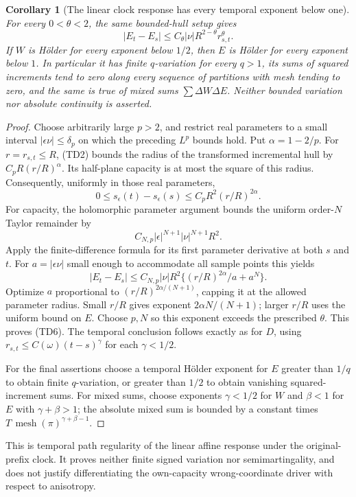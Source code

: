 \documentclass[11pt]{article}
\newtheorem{corollary}[theorem]{Corollary}
\theoremstyle{definition}\newtheorem{definition}[theorem]{Definition}
\theoremstyle{remark}\newtheorem{remark}[theorem]{Remark}
\begin{document}
\begin{corollary}[The linear clock response has every temporal exponent below one]
\label{cor:temporal-clock-response-nearly-lipschitz}
For every $0<\theta<2$, the same bounded-hull setup gives
\[
 |E_t-E_s|\le C_\theta|\nu|R^{2-\theta}r_{s,t}^{\theta}.
 \tag{TD6}
\]
If $W$ is H\"older for every exponent below $1/2$, then $E$ is
H\"older for every exponent below $1$. In particular it has finite
$q$-variation for every $q>1$, its sums of squared increments tend
to zero along every sequence of partitions with mesh tending to zero,
and the same is true of mixed sums $\sum\Delta W\Delta E$.
Neither bounded variation nor absolute continuity is asserted.
\end{corollary}
\begin{proof}
Choose arbitrarily large $p>2$, and restrict real parameters to a
small interval $|\epsilon\nu|\le\delta_p$ on which the preceding
$L^p$ bounds hold. Put $\alpha=1-2/p$. For $r=r_{s,t}\le R$,
(TD2) bounds the radius of the transformed incremental hull by
$C_p R(r/R)^\alpha$. Its half-plane capacity is at most the square
of this radius. Consequently, uniformly in those real parameters,
\[
 0\le s_\epsilon(t)-s_\epsilon(s)
      \le C_p R^2(r/R)^{2\alpha}.
\]
For capacity, the holomorphic parameter argument bounds the
uniform order-$N$ Taylor remainder by
\[
 C_{N,p}|\epsilon|^{N+1}|\nu|^{N+1}R^2.
\]
Apply the finite-difference formula for its first
parameter derivative at both $s$ and $t$. For $a=|\epsilon\nu|$
small enough to accommodate all sample points this yields
\[
 |E_t-E_s|\le C_{N,p}|\nu|R^2
                \{(r/R)^{2\alpha}/a+a^N\}.
\]
Optimize $a$ proportional to $(r/R)^{2\alpha/(N+1)}$, capping
it at the allowed parameter radius. Small $r/R$ gives exponent
$2\alpha N/(N+1)$; larger $r/R$ uses the uniform bound on $E$.
Choose $p,N$ so this exponent exceeds the prescribed $\theta$.
This proves (TD6). The temporal conclusion follows exactly as for
$D$, using $r_{s,t}\le C(\omega)(t-s)^\gamma$ for each
$\gamma<1/2$.

For the final assertions choose a temporal H\"older exponent for
$E$ greater than $1/q$ to obtain finite $q$-variation, or greater
than $1/2$ to obtain vanishing squared-increment sums. For mixed
sums, choose exponents $\gamma<1/2$ for $W$ and $\beta<1$ for
$E$ with $\gamma+\beta>1$; the absolute mixed sum is bounded by
a constant times $T\,\operatorname{mesh}(\pi)^{\gamma+\beta-1}$.
\end{proof}

This is temporal path regularity of the linear affine response under the
original-prefix clock. It proves neither finite signed variation nor
semimartingality, and does not justify differentiating the own-capacity
wrong-coordinate driver with respect to anisotropy.
\end{document}
